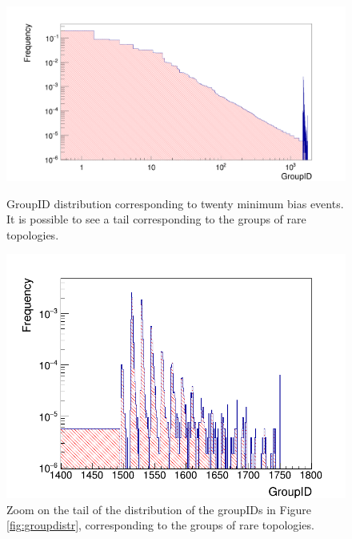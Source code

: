 \begin{figure}
  \centering
  \includegraphics[scale=0.2]{figures/grouped.png}
  \caption{GroupID distribution corresponding to twenty minimum bias events. It is possible to see a tail corresponding to the groups of rare topologies.}
  \label{fig:groupdistr}
  \vspace{1.5cm}
  \includegraphics[scale=0.45]{figures/zoom.png}
  \caption{Zoom on the tail of the distribution of the groupIDs in Figure \ref{fig:groupdistr}, corresponding to the groups of rare topologies.}
  \label{fig:groupzoom}
\end{figure}
%
